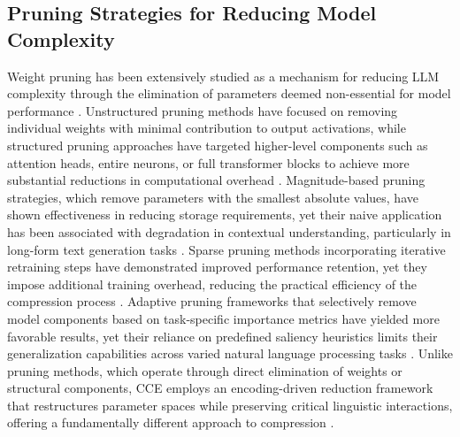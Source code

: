 \documentclass{article}
\begin{document}
\subsection{Pruning Strategies for Reducing Model Complexity}
Weight pruning has been extensively studied as a mechanism for reducing LLM complexity through the elimination of parameters deemed non-essential for model performance \cite{ huso2023binary}. Unstructured pruning methods have focused on removing individual weights with minimal contribution to output activations, while structured pruning approaches have targeted higher-level components such as attention heads, entire neurons, or full transformer blocks to achieve more substantial reductions in computational overhead \cite{ stefanov2024contextual}. Magnitude-based pruning strategies, which remove parameters with the smallest absolute values, have shown effectiveness in reducing storage requirements, yet their naive application has been associated with degradation in contextual understanding, particularly in long-form text generation tasks \cite{vima2024enhancing}. Sparse pruning methods incorporating iterative retraining steps have demonstrated improved performance retention, yet they impose additional training overhead, reducing the practical efficiency of the compression process \cite{navjord2023beyond}. Adaptive pruning frameworks that selectively remove model components based on task-specific importance metrics have yielded more favorable results, yet their reliance on predefined saliency heuristics limits their generalization capabilities across varied natural language processing tasks \cite{santos2024adaptive}. Unlike pruning methods, which operate through direct elimination of weights or structural components, CCE employs an encoding-driven reduction framework that restructures parameter spaces while preserving critical linguistic interactions, offering a fundamentally different approach to compression \cite{chester2024contextual}.
\end{document}
